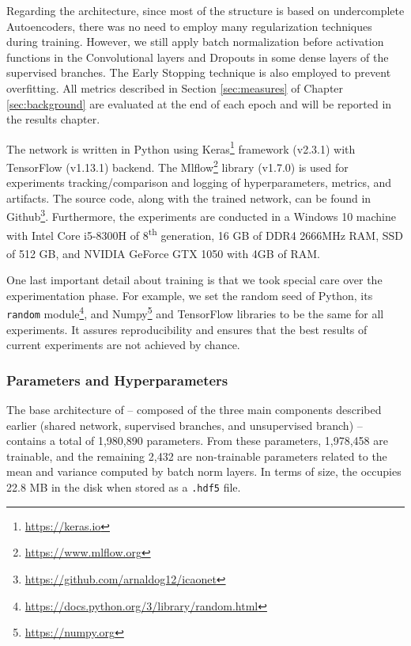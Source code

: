 Regarding the architecture, since most of the \methodname structure is based on undercomplete Autoencoders, there was no need to employ many regularization techniques during training. However, we still apply batch normalization before activation functions in the Convolutional layers and Dropouts in some dense layers of the supervised branches. The Early Stopping technique is also employed to prevent overfitting. All metrics described in Section \ref{sec:measures} of Chapter \ref{sec:background} are evaluated at the end of each epoch and will be reported in the results chapter.

The network is written in Python using Keras\footnote{\url{https://keras.io}} framework (v2.3.1) with TensorFlow (v1.13.1) backend. The Mlflow\footnote{\url{https://www.mlflow.org}} library (v1.7.0) is used for experiments tracking/comparison and logging of hyperparameters, metrics, and artifacts. The source code, along with the trained network, can be found in Github\footnote{\url{https://github.com/arnaldog12/icaonet}}. Furthermore, the experiments are conducted in a Windows 10 machine with Intel\textsuperscript{\tiny\textregistered} Core\textsuperscript{\tiny\texttrademark} i5-8300H of 8\textsuperscript{th} generation, 16 GB of DDR4 2666MHz RAM, SSD of 512 GB, and NVIDIA\textsuperscript{\tiny\textregistered} GeForce\textsuperscript{\tiny\textregistered} GTX 1050 with 4GB of RAM.

One last important detail about \methodname training is that we took special care over the experimentation phase. For example, we set the random seed of Python, its \texttt{random} module\footnote{\url{https://docs.python.org/3/library/random.html}}, and Numpy\footnote{\url{https://numpy.org}} and TensorFlow libraries to be the same for all experiments. It assures reproducibility and ensures that the best results of current experiments are not achieved by chance.

\subsubsection{Parameters and Hyperparameters} \label{sec:hyperparams}

The base architecture of \methodname -- composed of the three main components described earlier (shared network, supervised branches, and unsupervised branch) -- contains a total of 1,980,890 parameters. From these parameters, 1,978,458 are trainable, and the remaining 2,432 are non-trainable parameters related to the mean and variance computed by batch norm layers. In terms of size, the \methodname occupies 22.8 MB in the disk when stored as a \texttt{.hdf5} file.

